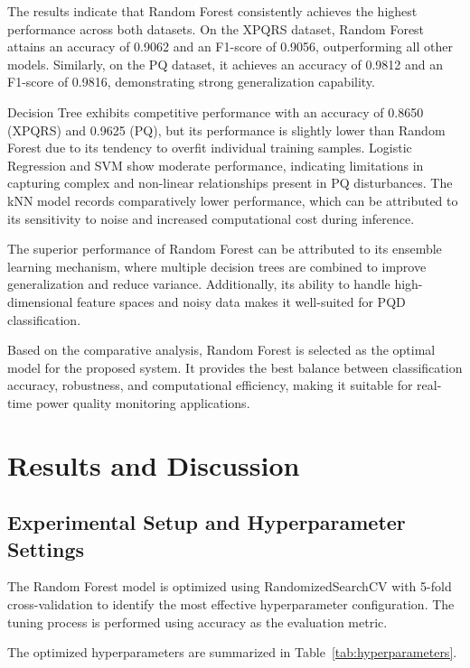 \documentclass[conference]{IEEEtran}
\begin{document}
The results indicate that Random Forest consistently achieves the highest performance across both datasets. On the XPQRS dataset, Random Forest attains an accuracy of 0.9062 and an F1-score of 0.9056, outperforming all other models. Similarly, on the PQ dataset, it achieves an accuracy of 0.9812 and an F1-score of 0.9816, demonstrating strong generalization capability.

Decision Tree exhibits competitive performance with an accuracy of 0.8650 (XPQRS) and 0.9625 (PQ), but its performance is slightly lower than Random Forest due to its tendency to overfit individual training samples. Logistic Regression and SVM show moderate performance, indicating limitations in capturing complex and non-linear relationships present in PQ disturbances. The kNN model records comparatively lower performance, which can be attributed to its sensitivity to noise and increased computational cost during inference.

The superior performance of Random Forest can be attributed to its ensemble learning mechanism, where multiple decision trees are combined to improve generalization and reduce variance. Additionally, its ability to handle high-dimensional feature spaces and noisy data makes it well-suited for PQD classification.

Based on the comparative analysis, Random Forest is selected as the optimal model for the proposed system. It provides the best balance between classification accuracy, robustness, and computational efficiency, making it suitable for real-time power quality monitoring applications.


\section{Results and Discussion}

\subsection{Experimental Setup and Hyperparameter Settings}

The Random Forest model is optimized using RandomizedSearchCV with 5-fold cross-validation to identify the most effective hyperparameter configuration. The tuning process is performed using accuracy as the evaluation metric.

The optimized hyperparameters are summarized in Table~\ref{tab:hyperparameters}.
\end{document}

